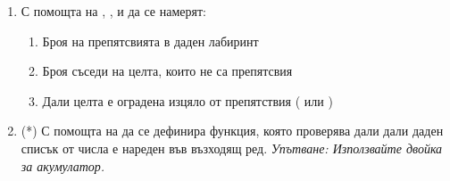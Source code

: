 \begin{enumerate}[resume]
	\item С помощта на , ,  и  да се намерят:
	\begin{enumerate}[label=\alph*)]
		\item Броя на препятсвията в даден лабиринт
		\item Броя съседи на целта, които не са препятсвия
		\item Дали целта е оградена изцяло от препятствия ( или )
	\end{enumerate}

	\item(*) С помощта на  да се дефинира функция, която проверява дали дали даден списък от числа  е нареден във възходящ ред. \emph{Упътване: Използвайте двойка  за акумулатор.}

\end{enumerate}
